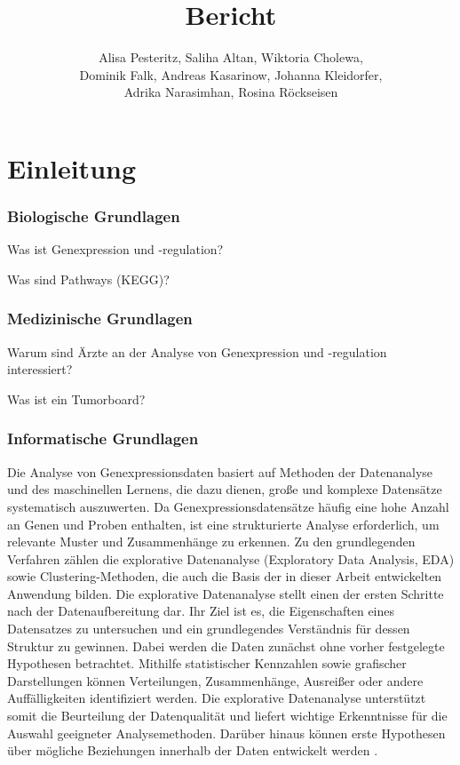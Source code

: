 \documentclass[12pt]{article}
\title{Bericht}
\author{Alisa Pesteritz, Saliha Altan, Wiktoria Cholewa, \\ 
	Dominik Falk, Andreas Kasarinow, Johanna Kleidorfer, \\
	Adrika Narasimhan, Rosina Röckseisen}
\begin{document}
\newpage
\maketitle

\newpage
\pagestyle{fancy}
\fancyhead{}
\section{Einleitung}
\label{einleitung}


\label{grundlagen}

\subsubsection{Biologische Grundlagen}
\label{bio-grundlagen}
Was ist Genexpression und -regulation?

Was sind Pathways (KEGG)?

\subsubsection{Medizinische Grundlagen}
\label{medizin-grundlagen}
Warum sind Ärzte an der Analyse von Genexpression und -regulation interessiert?

Was ist ein Tumorboard?

\subsubsection{Informatische Grundlagen}
\label{info-grundlagen}

Die Analyse von Genexpressionsdaten basiert auf Methoden der Datenanalyse und des maschinellen Lernens, die dazu dienen, große und komplexe Datensätze systematisch auszuwerten. Da Genexpressionsdatensätze häufig eine hohe Anzahl an Genen und Proben enthalten, ist eine strukturierte Analyse erforderlich, um relevante Muster und Zusammenhänge zu erkennen. Zu den grundlegenden Verfahren zählen die explorative Datenanalyse (Exploratory Data Analysis, EDA) sowie Clustering-Methoden, die auch die Basis der in dieser Arbeit entwickelten Anwendung bilden.
Die explorative Datenanalyse stellt einen der ersten Schritte nach der Datenaufbereitung dar. Ihr Ziel ist es, die Eigenschaften eines Datensatzes zu untersuchen und ein grundlegendes Verständnis für dessen Struktur zu gewinnen. Dabei werden die Daten zunächst ohne vorher festgelegte Hypothesen betrachtet. Mithilfe statistischer Kennzahlen sowie grafischer Darstellungen können Verteilungen, Zusammenhänge, Ausreißer oder andere Auffälligkeiten identifiziert werden. Die explorative Datenanalyse unterstützt somit die Beurteilung der Datenqualität und liefert wichtige Erkenntnisse für die Auswahl geeigneter Analysemethoden. Darüber hinaus können erste Hypothesen über mögliche Beziehungen innerhalb der Daten entwickelt werden \cite{Komorowski2016}.
\end{document}
